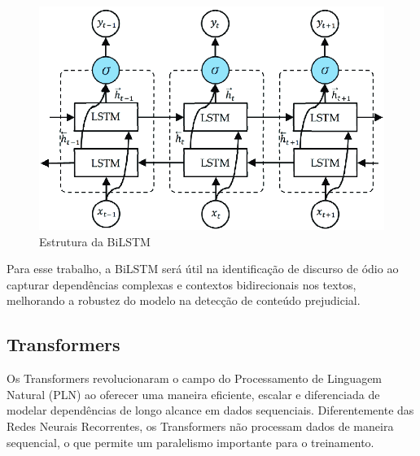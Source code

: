 \documentclass[conference]{IEEEtran}
\begin{document}
\begin{figure}[h!]
    \centering
    \includegraphics[width=\linewidth]{images/bilstm.png}
    \caption{Estrutura da BiLSTM}
    \label{fig:exemplo2}
\end{figure}

\indent Para esse trabalho, a BiLSTM será útil na identificação de discurso de ódio ao capturar dependências complexas e contextos bidirecionais nos textos, melhorando a robustez do modelo na detecção de conteúdo prejudicial.

\subsection{Transformers}

Os Transformers revolucionaram o campo do Processamento de Linguagem Natural (PLN) ao oferecer uma maneira eficiente, escalar e diferenciada de modelar dependências de longo alcance em dados sequenciais. Diferentemente das Redes Neurais Recorrentes, os Transformers não processam dados de maneira sequencial, o que permite um paralelismo \cite{mama} importante para o treinamento.
\end{document}
